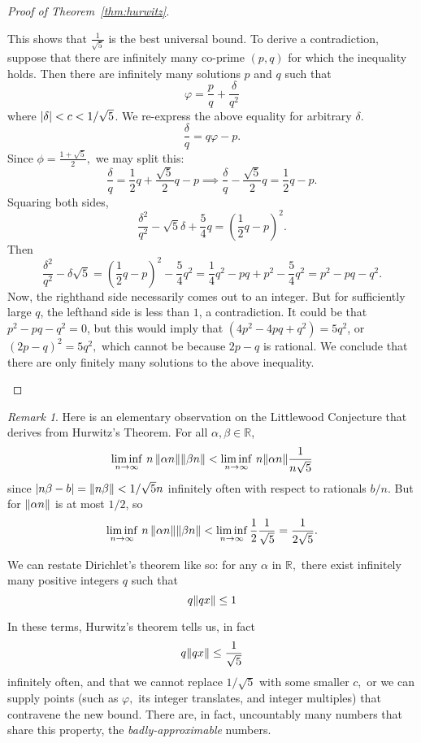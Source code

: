 \documentclass[12pt, letterpaper, oneside]{book}
\newcommand{\ga}{\ensuremath{\alpha}}
\newcommand{\gb}{\ensuremath{\beta}}
\newcommand{\gd}{\ensuremath{\delta}}
\newcommand{\gf}{\ensuremath{\varphi}}
\newcommand{\R}{\mathbb{R}}
\DeclarePairedDelimiter{\abs}{\lvert}{\rvert}
\DeclarePairedDelimiter{\norm}{\lVert}{\rVert}
\theoremstyle{plain}
\theoremstyle{definition}
\theoremstyle{remark}
\newtheorem*{remark}{Remark}
\begin{document}
\begin{proof}[Proof of Theorem~\ref{thm:hurwitz}]
\begin{enumerate}[(a)]
\[  \]
  This shows that $\frac{1}{\sqrt{5}}$ is the best universal bound.
  To derive a contradiction, suppose that there are infinitely many co-prime $(p,q)$ for which the inequality holds. 
  Then there are infinitely many solutions $p$ and $q$ such that
  \[
\gf = \frac{p}{q} + \frac{\delta}{q^2}
  \] 
  where $\abs{\delta} < c < 1/\sqrt{5}$.
We re-express the above equality for arbitrary $\gd.$
 \[
 \frac{\delta}{q} = q\gf - p.
 \]
 Since $\phi = \frac{1 +\sqrt{5}}{2},$ we may split this:
 \[
 \frac{\delta}{q} = \frac{1}{2}q + \frac{\sqrt{5}}{2}q - p \implies \frac{\delta}{q} - \frac{\sqrt{5}}{2}q = \frac{1}{2}q - p.
 \]
 Squaring both sides,
 \[
 \frac{\delta^2}{q^2} - \sqrt{5}\delta + \frac{5}{4}q = (\frac{1}{2}q - p)^2.
 \]
 Then
 \[
\frac{\delta^2}{q^2} - \delta\sqrt{5} = (\frac{1}{2}q - p)^2 - \frac{5}{4}q^2 = \frac{1}{4}q^2 - pq + p^2 - \frac{5}{4}q^2 = p^2 - pq - q^2.
 \]
 Now, the righthand side necessarily comes out to an integer. But for sufficiently large $q$, the lefthand side is less than $1$, a contradiction. It could be that $p^2 - pq  - q^2 = 0$, but this would imply that $(4p^2 - 4pq + q^2) = 5q^2$, or $(2p - q)^2 = 5q^2,$ which cannot be because $2p - q$ is rational. We conclude that there are only finitely many solutions to the above inequality.
  \end{enumerate}
  \end{proof}

\begin{remark} Here is an elementary observation on the Littlewood Conjecture that derives from Hurwitz's Theorem. For all $\ga,\gb \in \R$,
\[
  \liminf\limits_{n \to \infty}\, n\,\norm{\alpha n} \norm{\beta n}  < \liminf\limits_{n \to \infty} \, n\norm{\alpha n} \frac{1}{n\sqrt{5}}
  \]
 since $\abs{n\gb - b} = \norm{n\gb} < 1/\sqrt{5}n$ infinitely often with respect to rationals $b/n$. But for $\norm{\alpha n}$ is at most $1/2$, so
  \[
  \liminf\limits_{n \to \infty}\, n\,\norm{\alpha n} \norm{\beta n} < \liminf\limits_{n \to \infty} \frac{1}{2} \frac{1}{\sqrt{5}} = \frac{1}{2\sqrt{5}}.
  \]
\end{remark}

We can restate Dirichlet's theorem like so: for any $\ga$ in $\R,$ there exist infinitely many positive integers $q$ such that
\[
q\norm{qx} \leq 1
\]

In these terms, Hurwitz's theorem tells us, in fact
\[
q\norm{qx} \leq \frac{1}{\sqrt{5}}
\]
infinitely often, and that we cannot replace $1/\sqrt{5}$ with some smaller $c,$ or we can supply points (such as $\gf,$ its integer translates, and integer multiples) that contravene the new bound. There are, in fact, uncountably many numbers that share this property, the \textit{badly-approximable} numbers. 
\end{document}
